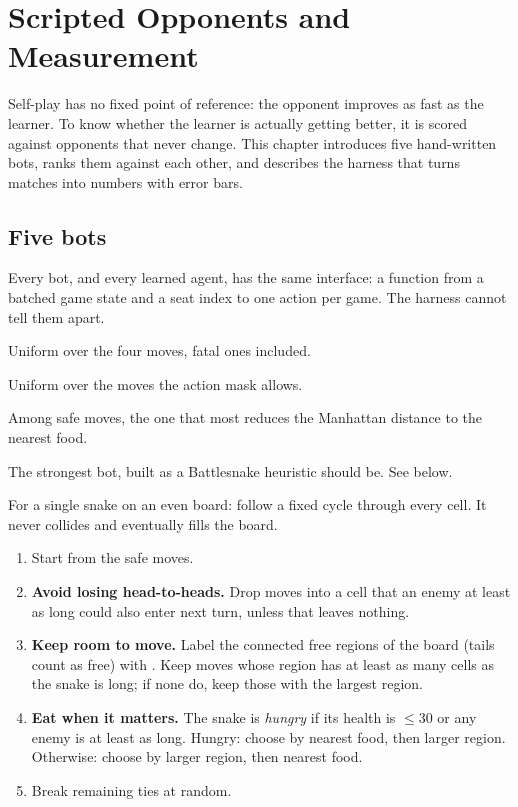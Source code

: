 \chapter{Scripted Opponents and Measurement}\label{ch:baselines}

Self-play has no fixed point of reference: the opponent improves as fast as the
learner. To know whether the learner is actually getting better, it is scored against
opponents that never change. This chapter introduces five hand-written bots, ranks them
against each other, and describes the harness that turns matches into numbers with error
bars.

\section{Five bots}

Every bot, and every learned agent, has the same interface: a function from a batched
game state and a seat index to one action per game. The harness cannot tell them apart.

\begin{defbox}
\begin{description}[leftmargin=1.2em,font=\normalfont\bfseries\color{inkblue}]
\item[random] Uniform over the four moves, fatal ones included.
\item[safe\_random] Uniform over the moves the action mask allows.
\item[greedy] Among safe moves, the one that most reduces the Manhattan distance to the
  nearest food.
\item[flood\_fill] The strongest bot, built as a Battlesnake heuristic should be. See
  below.
\item[hamiltonian] For a single snake on an even board: follow a fixed cycle through
  every cell. It never collides and eventually fills the board.
\end{description}
\end{defbox}

\begin{algbox}
\begin{enumerate}
\item Start from the safe moves.
\item \textbf{Avoid losing head-to-heads.} Drop moves into a cell that an enemy at least
  as long could also enter next turn, unless that leaves nothing.
\item \textbf{Keep room to move.} Label the connected free regions of the board (tails
  count as free) with . Keep moves whose region has at least as
  many cells as the snake is long; if none do, keep those with the largest region.
\item \textbf{Eat when it matters.} The snake is \emph{hungry} if its health is $\le 30$ or
  any enemy is at least as long. Hungry: choose by nearest food, then larger region.
  Otherwise: choose by larger region, then nearest food.
\item Break remaining ties at random.
\end{enumerate}
\end{algbox}

